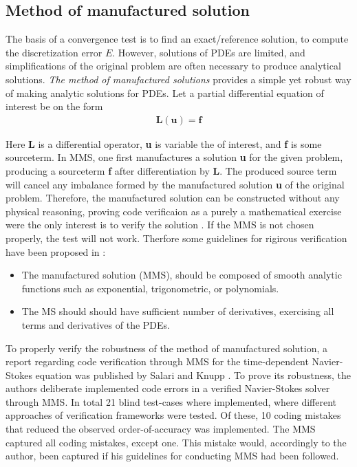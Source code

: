 \subsection{Method of manufactured solution}
The basis of a convergence test is to find an exact/reference solution,  to compute the discretization error $E$. However, solutions of PDEs are limited, and simplifications of the original problem are often necessary to produce analytical solutions. \textit{The method of manufactured solutions} provides a simple yet robust way of making analytic solutions for PDEs. 
Let a  partial differential equation of interest be on the form
\begin{align*}
\textbf{L}(\textbf{u}) = \textbf{f}
\end{align*}

Here \textbf{L} is a differential operator, \textbf{u} is variable the of interest, and \textbf{f} is some sourceterm. In MMS, one first manufactures a solution \textbf{u} for the given problem, producing a sourceterm  \textbf{f} after differentiation by \textbf{L}. The produced source term will cancel any imbalance formed by the manufactured solution \textbf{u} of the original problem. Therefore, the manufactured solution can be constructed without any physical reasoning, proving code verificaion as a purely a mathematical exercise were the only interest is to verify the solution \cite{Roache2002}. 
\newpage
If the MMS is not chosen properly, the test will not work. Therfore some guidelines for rigirous verification have been proposed in \cite{Etienne2006, Biggs, Roache2002}:

\begin{itemize}
\item The manufactured solution (MMS), should be composed of smooth analytic functions such as exponential, trigonometric, or polynomials.
\item The MS should should have sufficient number of derivatives, exercising all terms and derivatives of the PDEs. 
\end{itemize}

To properly verify the robustness of the method of manufactured solution, a report regarding code verification through  MMS for the time-dependent Navier-Stokes equation was published by Salari and Knupp \cite{Biggs}.  To prove its robustness, the authors deliberate implemented  code errors in a verified Navier-Stokes solver through MMS. In total 21 blind test-cases where implemented, where different approaches of verification frameworks were tested.  Of these, 10 coding mistakes that reduced the observed order-of-accuracy was implemented. The MMS captured all coding mistakes, except one. This mistake would, accordingly to the author, been captured if his guidelines for conducting MMS had been followed. \\

